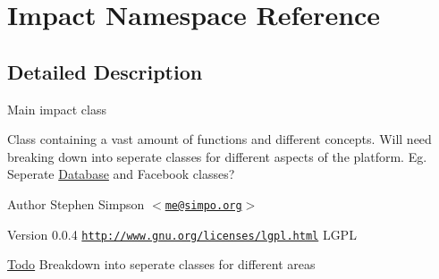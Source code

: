 \hypertarget{namespaceImpact}{
\section{Impact Namespace Reference}
\label{namespaceImpact}
}


\subsection{Detailed Description}
Main impact class

Class containing a vast amount of functions and different concepts. Will need breaking down into seperate classes for different aspects of the platform. Eg. Seperate \hyperlink{namespaceDatabase}{Database} and Facebook classes?

\begin{DoxyAuthor}{Author}
Stephen Simpson $<$\href{mailto:me@simpo.org}{\tt me@simpo.org}$>$ 
\end{DoxyAuthor}
\begin{DoxyVersion}{Version}
0.0.4  \href{http://www.gnu.org/licenses/lgpl.html}{\tt http://www.gnu.org/licenses/lgpl.html} LGPL
\end{DoxyVersion}
\begin{Desc}
\item[\hyperlink{todo__todo000002}{Todo}]Breakdown into seperate classes for different areas\end{Desc}

